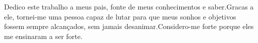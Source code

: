 \begin{dedicatoria}
 \vspace*{\fill}
  \noindent
  \hspace{.45\textwidth}
 \begin{minipage}{.5\textwidth}
    Dedico este trabalho a meus pais, fonte de meus conhecimentos  e saber.Gracas a ele, tornei-me uma pessoa capaz de lutar para que meus sonhos e objetivos fossem sempre alcançados, sem jamais desanimar.Considero-me forte porque eles me ensinaram a ser forte.
   \end{minipage}
\end{dedicatoria}